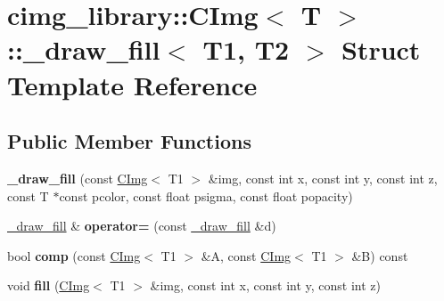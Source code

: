 \hypertarget{structcimg__library_1_1_c_img_1_1__draw__fill}{
\section{cimg\_\-library::CImg$<$ T $>$::\_\-draw\_\-fill$<$ T1, T2 $>$ Struct Template Reference}
\label{structcimg__library_1_1_c_img_1_1__draw__fill}
}
\subsection*{Public Member Functions}
\begin{DoxyCompactItemize}
\item 
\hypertarget{structcimg__library_1_1_c_img_1_1__draw__fill_a78e84ddb3e9d552e5afeb81429a25185}{
{\bfseries \_\-draw\_\-fill} (const \hyperlink{structcimg__library_1_1_c_img}{CImg}$<$ T1 $>$ \&img, const int x, const int y, const int z, const T $\ast$const pcolor, const float psigma, const float popacity)}
\label{structcimg__library_1_1_c_img_1_1__draw__fill_a78e84ddb3e9d552e5afeb81429a25185}

\item 
\hypertarget{structcimg__library_1_1_c_img_1_1__draw__fill_a430a12ef3a58973197e12f06125ed4ea}{
\hyperlink{structcimg__library_1_1_c_img_1_1__draw__fill}{\_\-draw\_\-fill} \& {\bfseries operator=} (const \hyperlink{structcimg__library_1_1_c_img_1_1__draw__fill}{\_\-draw\_\-fill} \&d)}
\label{structcimg__library_1_1_c_img_1_1__draw__fill_a430a12ef3a58973197e12f06125ed4ea}

\item 
\hypertarget{structcimg__library_1_1_c_img_1_1__draw__fill_a1dd27b0e5fee8392cc0ca2210a3c6b6e}{
bool {\bfseries comp} (const \hyperlink{structcimg__library_1_1_c_img}{CImg}$<$ T1 $>$ \&A, const \hyperlink{structcimg__library_1_1_c_img}{CImg}$<$ T1 $>$ \&B) const }
\label{structcimg__library_1_1_c_img_1_1__draw__fill_a1dd27b0e5fee8392cc0ca2210a3c6b6e}

\item 
\hypertarget{structcimg__library_1_1_c_img_1_1__draw__fill_aa3e50dd02275e51066bb7ab7f99bd0ba}{
void {\bfseries fill} (\hyperlink{structcimg__library_1_1_c_img}{CImg}$<$ T1 $>$ \&img, const int x, const int y, const int z)}
\label{structcimg__library_1_1_c_img_1_1__draw__fill_aa3e50dd02275e51066bb7ab7f99bd0ba}

\end{DoxyCompactItemize}
